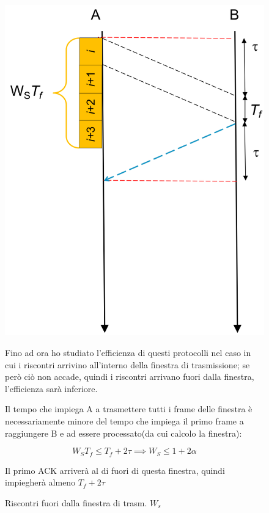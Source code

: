 \begin{figure}[htbp]
    \centering
    \begin{minipage}{0.45\textwidth}
        \includegraphics[width=\linewidth]{images/efficienzasrwr.png}
        \caption{Riscontri fuori dalla finestra di trasm. $W_s$}
    \end{minipage}%
    \hfill
    \begin{minipage}{0.5\textwidth}
        Fino ad ora ho studiato l'efficienza di questi protocolli nel caso in cui i riscontri arrivino all'interno della finestra di trasmissione; se però ciò non accade, quindi i riscontri arrivano fuori dalla finestra, l'efficienza sarà inferiore.

        Il tempo che impiega A a trasmettere tutti i frame delle finestra è necessariamente minore del tempo che impiega il primo frame a raggiungere B e ad essere processato(da cui calcolo la finestra):

        \begin{equation}
        W_S T_f \leq T_f + 2\tau \implies W_S \leq 1 + 2\alpha
        \end{equation}

            Il primo ACK arriverà al di fuori di questa finestra, quindi impiegherà almeno $T_f + 2\tau$

    \end{minipage}

\end{figure}


